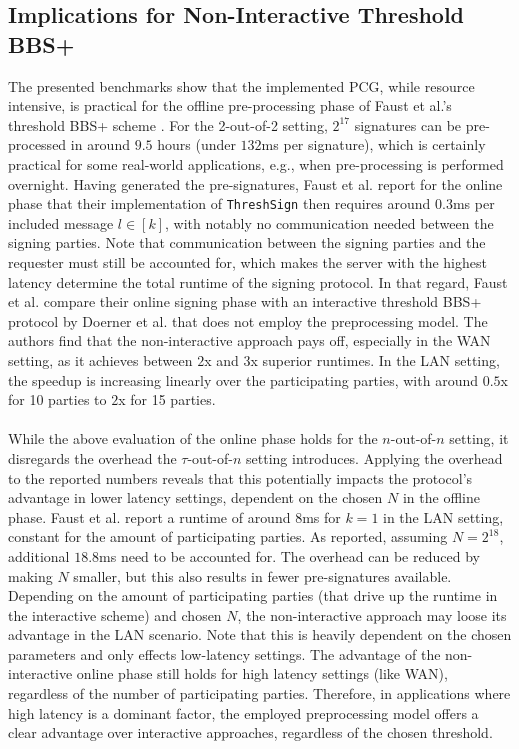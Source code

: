\subsection{Implications for Non-Interactive Threshold BBS+}
The presented benchmarks show that the implemented PCG, while resource intensive, is practical for the offline pre-processing phase of Faust et al.'s threshold BBS+ scheme \cite{cryptoeprint:2023/1076}. For the 2-out-of-2 setting, $2^{17}$ signatures can be pre-processed in around $9.5$ hours (under $132$ms per signature), which is certainly practical for some real-world applications, e.g., when pre-processing is performed overnight. Having generated the pre-signatures, Faust et al. \cite{cryptoeprint:2023/1076} report for the online phase that their implementation of \texttt{ThreshSign} then requires around $0.3$ms per included message $l\in[k]$, with notably no communication needed between the signing parties. Note that communication between the signing parties and the requester must still be accounted for, which makes the server with the highest latency determine the total runtime of the signing protocol. In that regard, Faust et al. compare their online signing phase with an interactive threshold BBS+ protocol by Doerner et al. \cite{doerner2023threshold} that does not employ the preprocessing model. The authors find that the non-interactive approach pays off, especially in the WAN setting, as it achieves between $2$x and $3$x superior runtimes. In the LAN setting, the speedup is increasing linearly over the participating parties, with around $0.5$x for 10 parties to $2$x for 15 parties.
\\\\
While the above evaluation of the online phase holds for the $n$-out-of-$n$ setting, it disregards the overhead the $\tau$-out-of-$n$ setting introduces. Applying the overhead to the reported numbers reveals that this potentially impacts the protocol's advantage in lower latency settings, dependent on the chosen $N$ in the offline phase. Faust et al. report a runtime of around $8$ms for $k=1$ in the LAN setting, constant for the amount of participating parties. As reported, assuming $N=2^{18}$, additional $18.8$ms need to be accounted for. The overhead can be reduced by making $N$ smaller, but this also results in fewer pre-signatures available. Depending on the amount of participating parties (that drive up the runtime in the interactive scheme) and chosen $N$, the non-interactive approach may loose its advantage in the LAN scenario. Note that this is heavily dependent on the chosen parameters and only effects low-latency settings. The advantage of the non-interactive online phase still holds for high latency settings (like WAN), regardless of the number of participating parties. Therefore, in applications where high latency is a dominant factor, the employed preprocessing model offers a clear advantage over interactive approaches, regardless of the chosen threshold.
